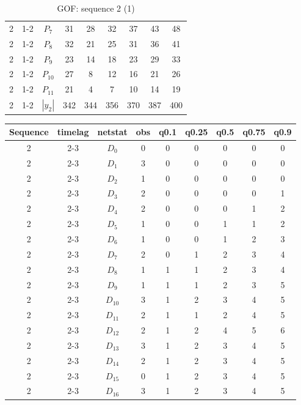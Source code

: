 \documentclass[a4paper, 11pt]{report}
\theoremstyle{definition}
\begin{document}
\begin{table}[h!]
\begin{tabular}{c| c | c | c | c |c |c |c |c }
            2 & 1-2 & $P_7$ & 31 & 28& 32& 37& 43& 48 \\
            2 & 1-2 & $P_8$ & 32 & 21& 25& 31& 36& 41 \\
            2 & 1-2 & $P_9$ & 23 & 14& 18& 23& 29& 33 \\
            2 & 1-2 & $P_{10}$ & 27 & 8& 12& 16& 21& 26 \\
            2 & 1-2 & $P_{11}$ & 21 & 4& 7& 10& 14& 19 \\
            2 & 1-2 & $|y_2|$ & 342 &  344& 356& 370& 387& 400 \\
        \end{tabular}
        \caption{GOF: sequence 2 (1)}
    \end{table}
\clearpage
\begin{table}[h!]
    \centering
        \begin{tabular}{c| c | c | c | c |c |c |c |c }
            Sequence& timelag & netstat & obs & q0.1 & q0.25 & q0.5 & q0.75 & q0.9 \\
            \hline \hline
            2 & 2-3 & $D_0$ & 0 &  0& 0& 0& 0& 0 \\
            2 & 2-3 & $D_1$ & 3 &  0& 0& 0& 0& 0 \\
            2 & 2-3 & $D_2$ & 1 &  0& 0& 0& 0& 0 \\
            2 & 2-3 & $D_3$ & 2 &  0& 0& 0& 0& 1 \\
            2 & 2-3 & $D_4$ & 2 &  0& 0& 0& 1& 2 \\
            2 & 2-3 & $D_5$ & 1 &  0& 0& 1& 1& 2 \\
            2 & 2-3 & $D_6$ & 1 &  0& 0& 1& 2& 3 \\
            2 & 2-3 & $D_7$ & 2 &  0& 1& 2& 3& 4 \\
            2 & 2-3 & $D_8$ & 1 &  1& 1& 2& 3& 4 \\
            2 & 2-3 & $D_9$ & 1 &  1& 1& 2& 3& 5 \\
            2 & 2-3 & $D_{10}$ & 3 &  1& 2& 3& 4& 5 \\
            2 & 2-3 & $D_{11}$ & 2 &  1& 1& 2& 4& 5 \\
            2 & 2-3 & $D_{12}$ & 2 &  1& 2& 4& 5& 6 \\
            2 & 2-3 & $D_{13}$ & 3 &  1& 2& 3& 4& 5 \\
            2 & 2-3 & $D_{14}$ & 2 &  1& 2& 3& 4& 5 \\
            2 & 2-3 & $D_{15}$ & 0 &  1& 2& 3& 4& 5 \\
            2 & 2-3 & $D_{16}$ & 3 &  1& 2& 3& 4& 5 \\

\end{tabular}
\end{table}
\end{document}
